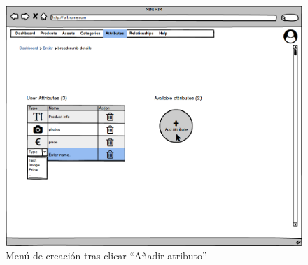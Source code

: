 \begin{figure}[H]
    \includegraphics[width=1\linewidth]{mockups/RF6.1Crear_Atributo tras Clickar.png}
    \caption{Menú de creación tras clicar \enquote{Añadir atributo}}
   \end{figure}
\vspace{1.0cm}

\newpage %